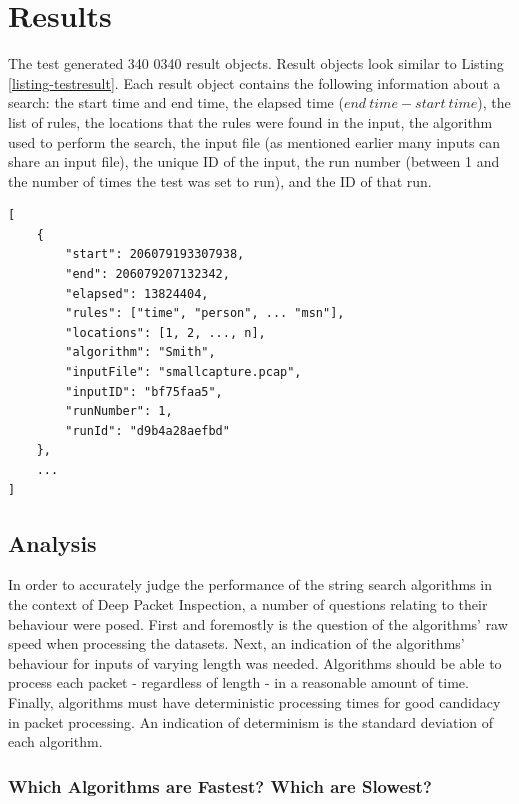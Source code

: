 \documentclass[9pt, technote]{IEEEtran}
\begin{document}
\section{Results}

The test generated 340 0340 result objects. Result objects look similar to Listing \ref{listing-testresult}. Each result object contains the following information about a search: the start time and end time, the elapsed time ($ end\ time - start\ time $), the list of rules, the locations that the rules were found in the input, the algorithm used to perform the search, the input file (as mentioned earlier many inputs can share an input file), the unique ID of the input, the run number (between 1 and the number of times the test was set to run), and the ID of that run.

\begin{lstlisting}[caption=Example result, label=listing-testresult, linewidth=\columnwidth, xleftmargin=5.0ex]
[
    {
        "start": 206079193307938,
        "end": 206079207132342,
        "elapsed": 13824404,
        "rules": ["time", "person", ... "msn"],
        "locations": [1, 2, ..., n],
        "algorithm": "Smith",
        "inputFile": "smallcapture.pcap",
        "inputID": "bf75faa5",
        "runNumber": 1,
        "runId": "d9b4a28aefbd"
    },
    ...
]
\end{lstlisting}

\subsection{Analysis}

In order to accurately judge the performance of the string search algorithms in the context of Deep Packet Inspection, a number of questions relating to their behaviour were posed. First and foremostly is the question of the algorithms' raw speed when processing the datasets. Next, an indication of the algorithms' behaviour for inputs of varying length was needed. Algorithms should be able to process each packet - regardless of length - in a reasonable amount of time. Finally, algorithms must have deterministic processing times for good candidacy in packet processing. An indication of determinism is the standard deviation of each algorithm. 

\subsubsection{Which Algorithms are Fastest? Which are Slowest?}
\end{document}
